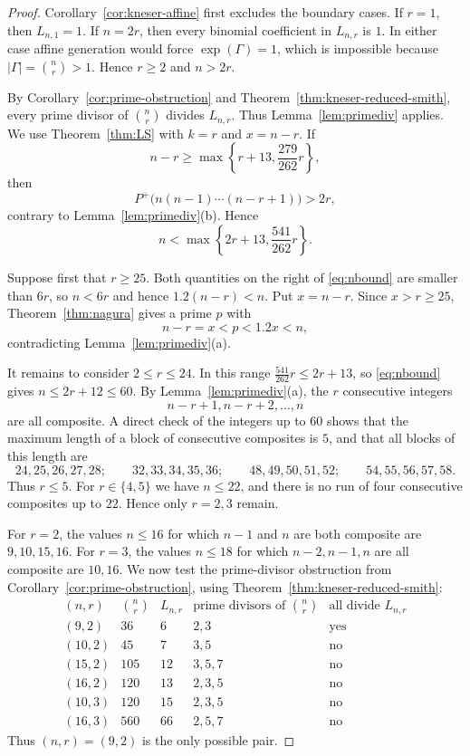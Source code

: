 \documentclass[11pt,reqno]{amsart}
\theoremstyle{plain}
\theoremstyle{definition}
\theoremstyle{remark}
\DeclareMathOperator{\ex}{exp}
\begin{document}
\begin{proof}
Corollary~\ref{cor:kneser-affine} first excludes the boundary cases. If $r=1$,
then $L_{n,1}=1$. If $n=2r$, then every binomial coefficient in $L_{n,r}$ is
$1$. In either case affine generation would force $\ex(\Gamma)=1$, which is
impossible because $|\Gamma|=\binom nr>1$. Hence $r\ge2$ and $n>2r$.

By Corollary~\ref{cor:prime-obstruction} and
Theorem~\ref{thm:kneser-reduced-smith}, every prime divisor of
$\binom nr$ divides $L_{n,r}$. Thus Lemma~\ref{lem:primediv} applies. We use
Theorem~\ref{thm:LS} with $k=r$ and $x=n-r$. If
\[
  n-r\ge\max\left\{r+13,\frac{279}{262}r\right\},
\]
then
\[
  P^{+}\bigl(n(n-1)\cdots(n-r+1)\bigr)>2r,
\]
contrary to Lemma~\ref{lem:primediv}(b). Hence
\begin{equation}\label{eq:nbound}
  n<\max\left\{2r+13,\frac{541}{262}r\right\}.
\end{equation}

Suppose first that $r\ge25$. Both quantities on the right of
\eqref{eq:nbound} are smaller than $6r$, so $n<6r$ and hence
$1.2(n-r)<n$. Put $x=n-r$. Since $x>r\ge25$,
Theorem~\ref{thm:nagura} gives a prime $p$ with
\[
  n-r=x<p<1.2x<n,
\]
contradicting Lemma~\ref{lem:primediv}(a).

It remains to consider $2\le r\le24$. In this range
$\frac{541}{262}r\le2r+13$, so \eqref{eq:nbound} gives
$n\le2r+12\le60$. By Lemma~\ref{lem:primediv}(a), the $r$ consecutive integers
\[
  n-r+1,n-r+2,\dots,n
\]
are all composite. A direct check of the integers up to $60$ shows that the
maximum length of a block of consecutive composites is $5$, and that all
blocks of this length are
\[
  24,25,26,27,28;\qquad
  32,33,34,35,36;\qquad
  48,49,50,51,52;\qquad
  54,55,56,57,58.
\]
Thus $r\le5$. For $r\in\{4,5\}$ we have $n\le22$, and there is no run of four
consecutive composites up to $22$. Hence only $r=2,3$ remain.

For $r=2$, the values $n\le16$ for which $n-1$ and $n$ are both composite are
$9,10,15,16$. For $r=3$, the values $n\le18$ for which $n-2,n-1,n$ are all
composite are $10,16$. We now test the prime-divisor obstruction from
Corollary~\ref{cor:prime-obstruction}, using
Theorem~\ref{thm:kneser-reduced-smith}:
\[
\begin{array}{c|c|c|c|c}
(n,r)&\binom nr&L_{n,r}&\text{prime divisors of }\binom nr
 &\text{all divide }L_{n,r}\\ \hline
(9,2)  &36 &6  &2,3   &\text{yes}\\
(10,2) &45 &7  &3,5   &\text{no}\\
(15,2) &105&12 &3,5,7 &\text{no}\\
(16,2) &120&13 &2,3,5 &\text{no}\\
(10,3) &120&15 &2,3,5 &\text{no}\\
(16,3) &560&66 &2,5,7 &\text{no}
\end{array}
\]
Thus $(n,r)=(9,2)$ is the only possible pair.


\end{proof}
\end{document}
